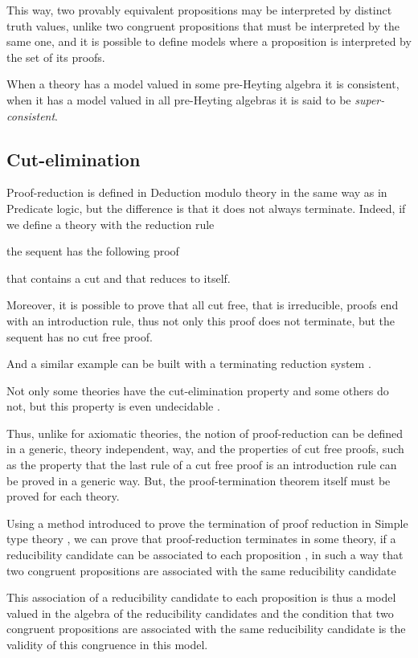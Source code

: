 \documentclass{llncs}
\begin{document}
This way, two provably equivalent propositions may be interpreted by 
distinct truth values, unlike two congruent propositions that must 
be interpreted by the same one, and it is possible to define models 
where a proposition  is interpreted by the set of its proofs. 

When a theory has a model valued in some pre-Heyting algebra 
it is consistent, when it has a model valued in all pre-Heyting algebras
it is said to be {\em super-consistent}. 

\subsection{Cut-elimination}

Proof-reduction is defined in Deduction modulo theory in the same way as 
in Predicate logic, but the difference is that it does not 
always terminate.
Indeed, if we define a theory with the reduction rule 
 
the sequent  has the following proof 

that contains a cut and that reduces to itself.

Moreover, it is possible to prove that all cut free, that is
irreducible, proofs end with an introduction rule, thus not only this
proof does not terminate, but the sequent  has no cut free
proof.

And a similar example can be built with a terminating
reduction system \cite{DowekWerner}.

Not only some theories have the cut-elimination property and some others
do not, but this property is even undecidable 
\cite{BurelKirchner,Hermantperso}. 

Thus, unlike for axiomatic theories, the notion of proof-reduction can be 
defined in a generic, theory independent, way, and the properties of 
cut free proofs, such as the property that the last rule of a cut free
proof is an introduction rule can be proved in a generic way. But, the 
proof-termination theorem itself must be proved for each theory.


Using a method introduced to prove the termination of proof reduction
in Simple type theory \cite{Girard}, 
we can prove that proof-reduction terminates in 
some theory, if a reducibility candidate 
can be associated to each proposition , 
in such a way that two congruent propositions 
are associated with the same reducibility candidate \cite{DowekWerner}


This association of a reducibility candidate to each proposition is
thus a model valued in the algebra of the reducibility candidates and
the condition that two congruent propositions are associated with the
same reducibility candidate is the validity of this congruence in this
model.
\end{document}
